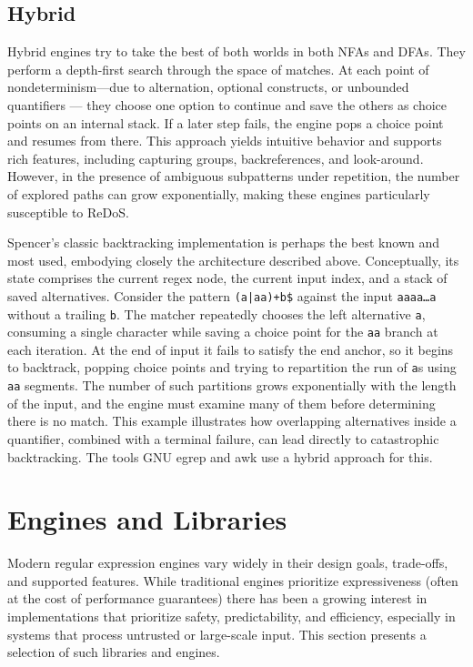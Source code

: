 \subsection{Hybrid}
Hybrid engines try to take the best of both worlds in both NFAs and DFAs. They perform a depth-first search through the space of matches. At each point of nondeterminism—due to alternation, optional constructs, or unbounded quantifiers — they choose one option to continue and save the others as choice points on an internal stack. If a later step fails, the engine pops a choice point and resumes from there. This approach yields intuitive behavior and supports rich features, including capturing groups, backreferences, and look-around. However, in the presence of ambiguous subpatterns under repetition, the number of explored paths can grow exponentially, making these engines particularly susceptible to ReDoS.

Spencer’s classic backtracking implementation is perhaps the best known and most used, embodying closely the architecture described above. Conceptually, its state comprises the current regex node, the current input index, and a stack of saved alternatives. Consider the pattern \texttt{(a|aa)+b\$} against the input \texttt{aaaa\ldots a} without a trailing \texttt{b}. The matcher repeatedly chooses the left alternative \texttt{a}, consuming a single character while saving a choice point for the \texttt{aa} branch at each iteration. At the end of input it fails to satisfy the end anchor, so it begins to backtrack, popping choice points and trying to repartition the run of \texttt{a}s using \texttt{aa} segments. The number of such partitions grows exponentially with the length of the input, and the engine must examine many of them before determining there is no match. This example illustrates how overlapping alternatives inside a quantifier, combined with a terminal failure, can lead directly to catastrophic backtracking.
The tools GNU egrep and awk use a hybrid approach for this.

\section{Engines and Libraries}
Modern regular expression engines vary widely in their design goals, trade-offs, and supported features. While traditional engines prioritize expressiveness (often at the cost of performance guarantees) there has been a growing interest in implementations that prioritize safety, predictability, and efficiency, especially in systems that process untrusted or large-scale input. This section presents a selection of such libraries and engines.


